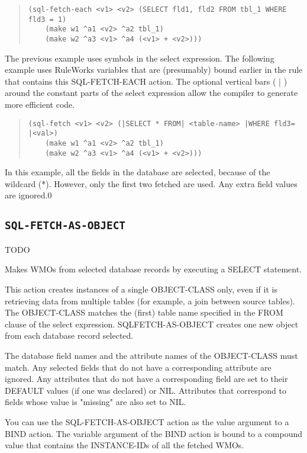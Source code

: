 {{\begin{quote}
\begin{verbatim}
(sql-fetch-each <v1> <v2> (SELECT fld1, fld2 FROM tbl_1 WHERE fld3 = 1)
    (make w1 ^a1 <v2> ^a2 tbl_1)
    (make w2 ^a3 <v1> ^a4 (<v1> + <v2>)))
\end{verbatim}
\end{quote}

The previous example uses symbols in the select expression.
The following example uses RuleWorks variables that are
(presumably) bound earlier in the rule that contains this
SQL-FETCH-EACH action. The optional vertical bars ( | )
around the constant parts of the select expression allow the
compiler to generate more efficient code.
\begin{quote}
\begin{verbatim}
(sql-fetch <v1> <v2> (|SELECT * FROM| <table-name> |WHERE fld3= |<val>)
    (make w1 ^a1 <v2> ^a2 tbl_1)
    (make w2 ^a3 <v1> ^a4 (<v1> + <v2>)))
\end{verbatim}
\end{quote}

In this example, all the fields in the database are selected,
because of the wildcard (*). However, only the first two
fetched are used. Any extra field values are ignored.0

\subsection{\tt{SQL-FETCH-AS-OBJECT}}
TODO

Makes WMOs from selected database records by executing a
SELECT statement.

This action creates instances of a single OBJECT-CLASS only,
even if it is retrieving data from multiple tables (for
example, a join between source tables). The OBJECT-CLASS
matches the (first) table name specified in the FROM clause
of the select expression. SQLFETCH-AS-OBJECT creates one new
object from each database record selected.

The database field names and the attribute names of the
OBJECT-CLASS must match. Any selected fields that do not have
a corresponding attribute are ignored. Any attributes that do
not have a corresponding field are set to their DEFAULT
values (if one was declared) or NIL. Attributes that
correspond to fields whose value is "missing" are also set to
NIL.

You can use the SQL-FETCH-AS-OBJECT action as the value
argument to a BIND action. The variable argument of the BIND
action is bound to a compound value that contains the
INSTANCE-IDs of all the fetched WMOs.



}}
